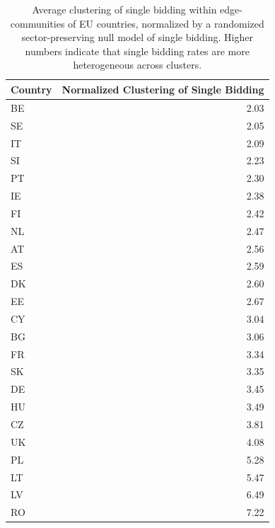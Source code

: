 \begin{table}
\begin{tabular}{lr}
\toprule
Country &  Normalized Clustering of Single Bidding\\
\midrule
BE      &                 2.03 \\
SE      &                 2.05 \\
IT      &                 2.09 \\
SI      &                 2.23 \\
PT      &                 2.30 \\
IE      &                 2.38 \\
FI      &                 2.42 \\
NL      &                 2.47 \\
AT      &                 2.56 \\
ES      &                 2.59 \\
DK      &                 2.60 \\
EE      &                 2.67 \\
CY      &                 3.04 \\
BG      &                 3.06 \\
FR      &                 3.34 \\
SK      &                 3.35 \\
DE      &                 3.45 \\
HU      &                 3.49 \\
CZ      &                 3.81 \\
UK      &                 4.08 \\
PL      &                 5.28 \\
LT      &                 5.47 \\
LV      &                 6.49 \\
RO      &                 7.22 \\
\bottomrule
\end{tabular}
\caption[Clustering of Single Bidding by Country]{Average clustering of single bidding within edge-communities of EU countries, normalized by a randomized sector-preserving null model of single bidding. Higher numbers indicate that single bidding rates are more heterogeneous across clusters.}
\label{table:clustering_sb}
\end{table}


